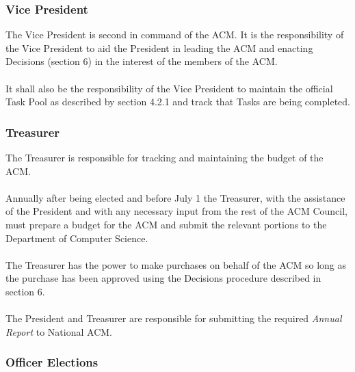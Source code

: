 \documentclass[12pt,titlepage]{article}
\begin{document}
\subsubsection{Vice President}

The Vice President is second in command of the ACM. It is the responsibility of the Vice President to aid the President in leading the ACM and enacting Decisions (section 6) in the interest of the members of the ACM.\\
\\
It shall also be the responsibility of the Vice President to maintain the official Task Pool as described by section 4.2.1 and track that Tasks are being completed.

\subsubsection{Treasurer}

The Treasurer is responsible for tracking and maintaining the budget of the ACM.\\
\\
Annually after being elected and before July 1 the Treasurer, with the assistance of the President and with any necessary input from the rest of the ACM Council, must prepare a budget for the ACM and submit the relevant portions to the Department of Computer Science.\\
\\
The Treasurer has the power to make purchases on behalf of the ACM so long as the purchase has been approved using the Decisions procedure described in section 6.\\
\\
The President and Treasurer are responsible for submitting the required \emph{Annual Report} to National ACM.

\subsubsection{Officer Elections}
\end{document}
